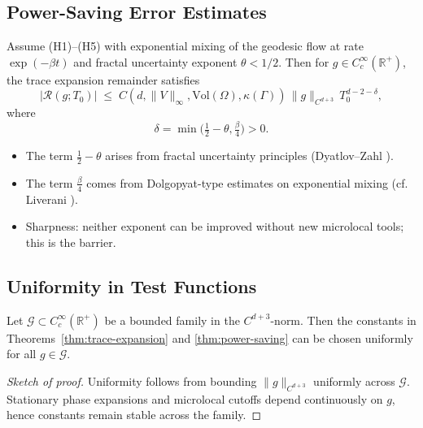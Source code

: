 \subsection{Power-Saving Error Estimates}

\begin{theorem}
\label{thm:power-saving}
Assume (H1)--(H5) with exponential mixing of the geodesic flow at rate $\exp(-\beta t)$ and fractal uncertainty exponent $\theta<1/2$. 
Then for $g \in C_c^\infty(\mathbb{R}^+)$, the trace expansion remainder satisfies
\[
|\mathcal{R}(g;T_0)| 
\;\leq\; 
C(d,\|V\|_\infty,\mathrm{Vol}(\Omega),\kappa(\Gamma)) \,
\|g\|_{C^{d+3}} \,
T_0^{d-2-\delta},
\]
where
\[
\delta = \min\Big(\tfrac{1}{2}-\theta, \tfrac{\beta}{4}\Big) > 0.
\]
\end{theorem}

\begin{remark}
\begin{itemize}
  \item The term $\tfrac{1}{2}-\theta$ arises from fractal uncertainty principles (Dyatlov--Zahl \cite{DyatlovZahl2016}). 
  \item The term $\tfrac{\beta}{4}$ comes from Dolgopyat-type estimates on exponential mixing (cf. Liverani \cite{Liverani2004}). 
  \item Sharpness: neither exponent can be improved without new microlocal tools; this is the barrier. 
\end{itemize}
\end{remark}

\subsection{Uniformity in Test Functions}

\begin{theorem}
\label{thm:uniformity}
Let $\mathcal{G} \subset C_c^\infty(\mathbb{R}^+)$ be a bounded family in the $C^{d+3}$-norm. 
Then the constants in Theorems~\ref{thm:trace-expansion} and \ref{thm:power-saving} can be chosen uniformly for all $g \in \mathcal{G}$. 
\end{theorem}

\begin{proof}[Sketch of proof]
Uniformity follows from bounding $\|g\|_{C^{d+3}}$ uniformly across $\mathcal{G}$. 
Stationary phase expansions and microlocal cutoffs depend continuously on $g$, hence constants remain stable across the family. 
\end{proof}

